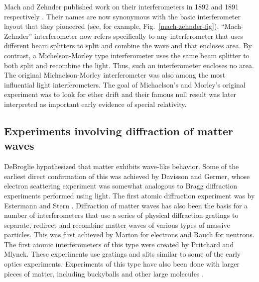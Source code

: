 Mach and Zehnder published work on their interferometers in 1892 and 1891 respectively \cite{mach}\cite{zehnder}. Their names are now synonymous with the basic interferometer layout that they pioneered (see, for example, Fig.~\ref{mach-zehnder-fig}).  ``Mach-Zehnder'' interferometer now refers specifically to any interferometer that uses different beam splitters to split and combine the wave and that encloses area. By contrast, a Michelson-Morley type interferometer uses the same beam splitter to both split and recombine the light. Thus, such an interferometer encloses no area. 
The original Michaelson-Morley interferometer was also among the most influential light interferometers. The goal of Michaelson's and Morley's original experiment was to look for ether drift and their famous null result was later interpreted as important early evidence of special relativity.

\subsection{Experiments involving diffraction of matter waves}
DeBroglie hypothesized that matter exhibits wave-like behavior. Some of the earliest direct confirmation of this was achieved by Davisson and Germer\cite{davisson_and_germer}, whose electron scattering experiment was somewhat analogous to Bragg diffraction experiments performed using light. The first atomic diffraction experiment was by Estermann and Stern \cite{esterman_stern}\cite{Kronin_RMP}. Diffraction of matter waves has also been the basis for a number of interferometers that use a series of physical diffraction gratings to separate, redirect and recombine matter waves of various types of massive particles. This was first achieved by Marton\cite{electronGrating} for electrons and Rauch\cite{neutronGrating} for neutrons. The first atomic interferometers of this type were created by Pritchard\cite{pritchard1991} and Mlynek\cite{youngDoubleSlit_Carnal_Mlynek}. These experiments use gratings and slits similar to some of the early optics experiments. Experiments of this type have also been done with larger pieces of matter, including buckyballs\cite{C60_interferometry} and other large molecules \cite{large_molecule_interferometry}.

